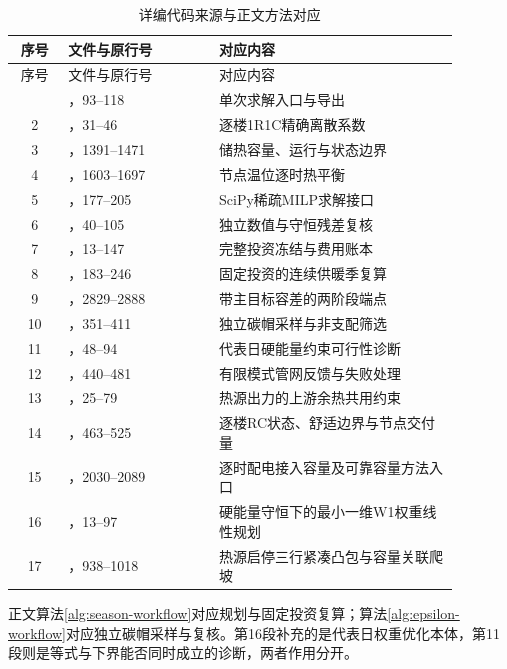 \begin{longtable}{@{}cL{0.34\linewidth}L{0.54\linewidth}@{}}
\caption{详编代码来源与正文方法对应}\label{tab:code-index-a4}\\
\toprule
序号 & 文件与原行号 & 对应内容\\\midrule
\endfirsthead
\toprule 序号 & 文件与原行号 & 对应内容\\\midrule
\endhead
\bottomrule{} & ，93--118 & 单次求解入口与导出\\
2 & ，31--46 & 逐楼1R1C精确离散系数\\
3 & ，1391--1471 & 储热容量、运行与状态边界\\
4 & ，1603--1697 & 节点温位逐时热平衡\\
5 & ，177--205 & SciPy稀疏MILP求解接口\\
6 & ，40--105 & 独立数值与守恒残差复核\\
7 & ，13--147 & 完整投资冻结与费用账本\\
8 & ，183--246 & 固定投资的连续供暖季复算\\
9 & ，2829--2888 & 带主目标容差的两阶段端点\\
10 & ，351--411 & 独立碳帽采样与非支配筛选\\
11 & ，48--94 & 代表日硬能量约束可行性诊断\\
12 & ，440--481 & 有限模式管网反馈与失败处理\\
13 & ，25--79 & 热源出力的上游余热共用约束\\
14 & ，463--525 & 逐楼RC状态、舒适边界与节点交付量\\
15 & ，2030--2089 & 逐时配电接入容量及可靠容量方法入口\\
16 & ，13--97 & 硬能量守恒下的最小一维W1权重线性规划\\
17 & ，938--1018 & 热源启停三行紧凑凸包与容量关联爬坡\\
\end{longtable}

正文算法\ref{alg:season-workflow}对应规划与固定投资复算；算法\ref{alg:epsilon-workflow}对应独立碳帽采样与复核。第16段补充的是代表日权重优化本体，第11段则是等式与下界能否同时成立的诊断，两者作用分开。

